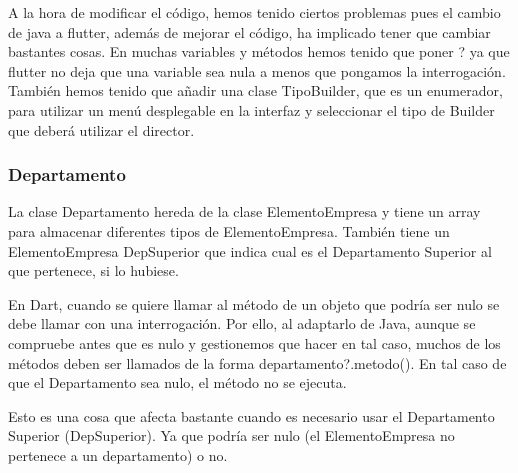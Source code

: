 \documentclass[
]{article}
\begin{document}
A la hora de modificar el código, hemos tenido ciertos problemas pues el
cambio de java a flutter, además de mejorar el código, ha implicado
tener que cambiar bastantes cosas. En muchas variables y métodos hemos
tenido que poner ? ya que flutter no deja que una variable sea nula a
menos que pongamos la interrogación. También hemos tenido que añadir una
clase TipoBuilder, que es un enumerador, para utilizar un menú
desplegable en la interfaz y seleccionar el tipo de Builder que deberá
utilizar el director.

\subsubsection{Departamento}\label{departamento}

La clase Departamento hereda de la clase ElementoEmpresa y tiene un
array para almacenar diferentes tipos de ElementoEmpresa. También tiene
un ElementoEmpresa DepSuperior que indica cual es el Departamento
Superior al que pertenece, si lo hubiese.

En Dart, cuando se quiere llamar al método de un objeto que podría ser
nulo se debe llamar con una interrogación. Por ello, al adaptarlo de
Java, aunque se compruebe antes que es nulo y gestionemos que hacer en
tal caso, muchos de los métodos deben ser llamados de la forma
departamento?.metodo(). En tal caso de que el Departamento sea nulo, el
método no se ejecuta.

Esto es una cosa que afecta bastante cuando es necesario usar el
Departamento Superior (DepSuperior). Ya que podría ser nulo (el
ElementoEmpresa no pertenece a un departamento) o no.
\end{document}
